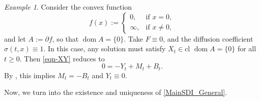 \documentclass[11pt,reqno]{article}
\newcommand{\dom}{\operatorname{dom}}
\newcommand{\cl}{{\text{cl }}}
\newcommand{\1}{\mathds{1}}
\numberwithin{equation}{section}  %
\theoremstyle{plain}
\theoremstyle{definition}
\theoremstyle{remark}
\newtheorem{example}{Example}
\numberwithin{theorem}{section}
\numberwithin{remark}{section}
\numberwithin{example}{section}
\begin{document}
\begin{example}
Consider the convex function
\[
    f(x) :=
    \begin{cases}
        0, & \text{if } x = 0, \\
        \infty, & \text{if } x \neq 0,
    \end{cases}
\]
and let $A := \partial f$, so that $\dom A=\{0\}$. Take $F\equiv 0$, and  the diffusion coefficient $\sigma(t,x) \equiv 1$.  
In this case, any solution must satisfy $X_t \in \cl{\dom A} = \{0\}$ for all $t \geq 0$. Then \eqref{eqn-XY} reduces to
\[
    0 = -Y_t + M_t + B_t.
\]
By \cite[Theorem~4.8]{MR3497465}, this implies $M_t = -B_t$ and $Y_t \equiv 0$.  
\end{example}



Now, we turn into the existence and uniqueness of   \eqref{MainSDI_General}. 
\end{document}

